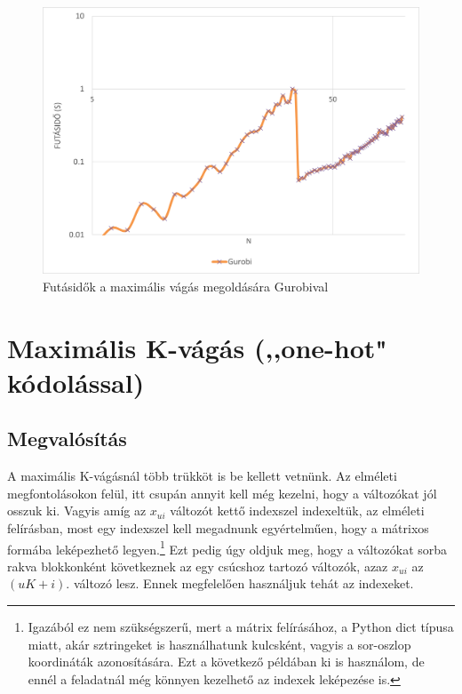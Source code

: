 \begin{figure}[!ht]
	\centering
	\includegraphics[width=150mm, keepaspectratio]{figures/diagrams/Gurobi_runtimes.png}
	\caption{Futásidők a maximális vágás megoldására Gurobival}
	\label{fig:maxCutGurobiRuntimes}
\end{figure}

\section{Maximális K-vágás (,,one-hot" kódolással)}\label{sec:practiceOneHot}

\subsection{Megvalósítás}

A maximális K-vágásnál több trükköt is be kellett vetnünk. Az elméleti megfontolásokon felül, itt csupán annyit kell még kezelni, hogy a változókat jól osszuk ki. Vagyis amíg az $x_{ui}$ változót kettő indexszel indexeltük, az elméleti felírásban, most egy indexszel kell megadnunk egyértelműen, hogy a mátrixos formába leképezhető legyen.\footnote{Igazából ez nem szükségszerű, mert a mátrix felírásához, a Python dict típusa miatt, akár sztringeket is használhatunk kulcsként, vagyis a sor-oszlop koordináták azonosítására. Ezt a következő példában ki is használom, de ennél a feladatnál még könnyen kezelhető az indexek leképezése is.}
Ezt pedig úgy oldjuk meg, hogy a változókat sorba rakva blokkonként következnek az egy csúcshoz tartozó változók, azaz $x_{ui}$ az $(uK+i)$. változó lesz. Ennek megfelelően használjuk tehát az indexeket.

